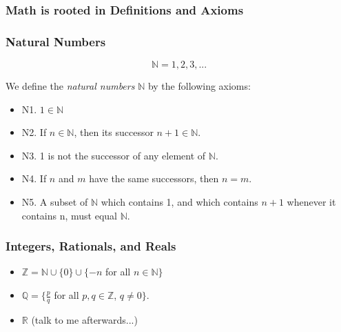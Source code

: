 \documentclass[10pt]{beamer}
\def\R{\mathbb{R}}                     %
\def\N{\mathbb{N}}                     %
\def\Z{\mathbb{Z}}                     %
\def\Q{\mathbb{Q}}                     %
\begin{document}
\begin{frame}
  \frametitle{Math is rooted in Definitions and Axioms}
\end{frame}

\begin{frame}
  \frametitle{Natural Numbers}

  \[ \N = {1, 2, 3, ...} \]

  \pause

  We define the \textit{natural numbers} $\N$ by the following axioms: \pause

  \begin{itemize}
  \item N1. $1 \in \N$ \pause
  \item N2. If $n \in \N$, then its successor $n + 1 \in \N$. \pause
  \item N3. 1 is not the successor of any element of $\N$. \pause
  \item N4. If $n$ and $m$ have the same successors, then $n = m$. \pause
  \item N5. A subset of $\N$ which contains 1, and which contains $n + 1$ whenever it contains n, must equal $\N$.
  \end{itemize}
\end{frame}

\begin{frame}
  \frametitle{Integers, Rationals, and Reals}

  \begin{itemize}
  \item $\Z = \N \cup \{0\} \cup \{ -n $ for all $n \in \N \}$ \pause
  \item $\Q = \{ \frac{p}{q} $ for all $p, q \in \Z$, $q \ne 0\}$. \pause
  \item $\R$ (talk to me afterwards...)
  \end{itemize}
\end{frame}
\end{document}
